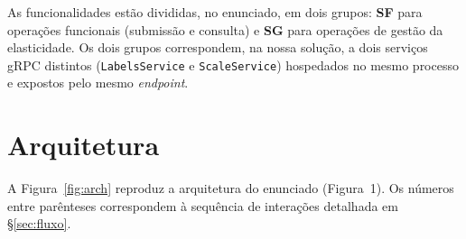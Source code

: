 \documentclass[11pt,a4paper]{article}
\begin{document}
As funcionalidades est\~ao divididas, no enunciado, em dois grupos:
\textbf{SF} para opera\c{c}\~oes funcionais (submiss\~ao e consulta) e
\textbf{SG} para opera\c{c}\~oes de gest\~ao da elasticidade. Os dois grupos
correspondem, na nossa solu\c{c}\~ao, a dois servi\c{c}os gRPC distintos
(\texttt{LabelsService} e \texttt{ScaleService}) hospedados no mesmo
processo e expostos pelo mesmo \emph{endpoint}.

\section{Arquitetura}
\label{sec:arquitetura}

A Figura~\ref{fig:arch} reproduz a arquitetura do enunciado (Figura~1).
Os n\'umeros entre par\^enteses correspondem \`a sequ\^encia de
intera\c{c}\~oes detalhada em \S\ref{sec:fluxo}.
\end{document}
